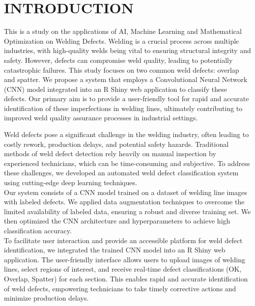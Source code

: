 \documentclass{article_saj}
\renewcommand{\thefootnote}{\fnsymbol{footnote}}
\begin{document}
\tenrm


\section{INTRODUCTION}

\indent

This
is a study on the applications of AI, Machine Learning and Mathematical Optimization on Welding Defects. Welding is a crucial process across multiple industries, with high-quality welds being vital to ensuring structural integrity and safety. However, defects can compromise weld quality, leading to potentially catastrophic failures. This study focuses on two common weld defects: overlap and spatter. We propose a system that employs a Convolutional Neural Network (CNN) model integrated into an R Shiny web application to classify these defects. Our primary aim is to provide a user-friendly tool for rapid and accurate identification of these imperfections in welding lines, ultimately contributing to improved weld quality assurance processes in industrial settings.\\


\renewcommand{\thefootnote}{\arabic{footnote}}

\indent
Weld defects pose a significant challenge in the welding industry, often leading to costly rework, production delays, and potential safety hazards. Traditional methods of weld defect detection rely heavily on manual inspection by experienced technicians, which can be time-consuming and subjective. To address these challenges, we developed an automated weld defect classification system using cutting-edge deep learning techniques.\\

\indent
Our system consists of a CNN model trained on a dataset of welding line images with labeled defects. We applied data augmentation techniques to overcome the limited availability of labeled data, ensuring a robust and diverse training set. We then optimized the CNN architecture and hyperparameters to achieve high classification accuracy.\\

\indent
To facilitate user interaction and provide an accessible platform for weld defect identification, we integrated the trained CNN model into an R Shiny web application. The user-friendly interface allows users to upload images of welding lines, select regions of interest, and receive real-time defect classifications (OK, Overlap, Spatter) for each section. This enables rapid and accurate identification of weld defects, empowering technicians to take timely corrective actions and minimize production delays.\\
\end{document}
